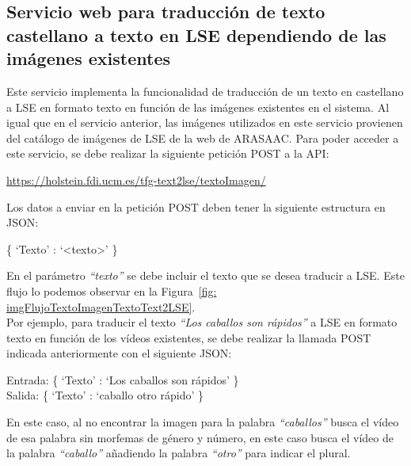 \subsection{Servicio web para traducción de texto castellano a texto en LSE dependiendo de las imágenes existentes}

Este servicio implementa la funcionalidad de traducción de un texto en castellano a LSE en formato texto en función de las imágenes existentes en el sistema. Al igual que en el servicio anterior, las imágenes utilizados en este servicio provienen del catálogo de imágenes de LSE de la web de ARASAAC. Para poder acceder a este servicio, se debe realizar la siguiente petición POST a la API:\\

\begin{shaded}
	\url{https://holstein.fdi.ucm.es/tfg-text2lse/textoImagen/  }	
\end{shaded}


Los datos a enviar en la petición POST deben tener la siguiente estructura en JSON: 
\begin{center}
	
	\{ `Texto' : `<texto>' \}
	
\end{center}


En el parámetro \textit{``texto''} se debe incluir el texto que se desea traducir a LSE. Este flujo lo podemos observar en la Figura~\ref {fig: imgFlujoTextoImagenTextoText2LSE}.\\

Por ejemplo, para traducir el texto \textit{``Los caballos son rápidos''} a LSE en formato texto en función de los vídeos existentes, se debe realizar la llamada POST indicada anteriormente con el siguiente JSON:


\begin{center}
	Entrada: \{ `Texto' : `Los caballos son rápidos' \} \\
	Salida: \{ `Texto' : `caballo otro rápido' \}
\end{center}

En este caso, al no encontrar la imagen para la palabra \textit{``caballos''} busca el vídeo de esa palabra sin morfemas de género y número, en este caso busca el vídeo de la palabra \textit{``caballo''} añadiendo la palabra  \textit{``otro''} para indicar el plural.



